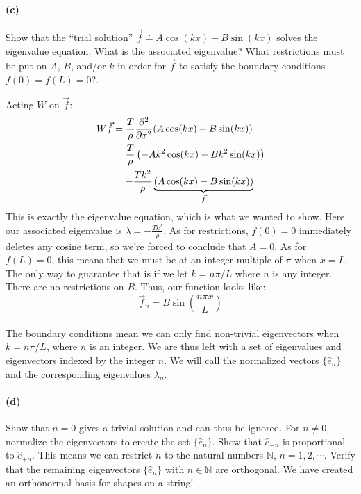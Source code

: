 \documentclass{article}
\begin{document}
\paragraph{(c)}
Show that the ``trial solution'' $\vec{f}\doteq A\cos(kx) + B \sin(kx)$ solves the eigenvalue equation.  What is the associated eigenvalue?
What restrictions must be put on $A$, $B$, and/or $k$ in order for $\vec{f}$ to satisfy the boundary conditions $f(0)=f(L)=0$?.

\begin{solution}
	Acting $W$ on $\vec f$:
	\begin{align*}
		W \vec f &= \frac{T}{\rho}\pdv[2]{x}(A \cos(kx) + B \sin (kx))\\
		&= \frac{T}{\rho}\left(-Ak^2 \cos(kx) - Bk^2\sin(kx)\right) \\
		&= -\frac{Tk^2}{\rho}\underbrace{(A \cos(kx) - B\sin(kx))}_{\vec f} 
	\end{align*}
	This is exactly the eigenvalue equation, which is what we wanted to show. Here, our associated eigenvalue is
	$\lambda = -\frac{Tk^2}{\rho}$. As for restrictions, $f(0) = 0$ immediately 
	deletes any cosine term, so we're forced to conclude that $A = 0$. As for $f(L) = 0$, this means that 
	we must be at an integer multiple of $\pi$ when $x = L$. The only way to guarantee that is if we let 
	$k = n\pi / L$ where $n$ is any integer. There are no restrictions on $B$. Thus, our function looks like:
	\[
	\vec f_n = B\sin(\frac{n \pi x}{L})
	\] 
\end{solution}
\phline
\paragraph{} 
The boundary conditions mean we can only find non-trivial eigenvectors when $k=n\pi/L$, where $n$ is an integer.  We are thus left with a set of eigenvalues and eigenvectors 
indexed by the integer $n$.  We will call the normalized vectors $\{\hat{e}_{n}\}$ and the corresponding eigenvalues $\lambda_{n}$.

\paragraph{(d)}
Show that $n=0$ gives a trivial solution and can thus be ignored.  For $n\neq 0$, normalize the eigenvectors to create the set $\{\hat{e}_{n}\}$.  Show that
$\hat{e}_{-n}$ is proportional to $\hat{e}_{+n}$.  This means we can restrict $n$ to the natural numbers $\mathbb{N}$, $n=1,2,\cdots$.
Verify that the remaining eigenvectors $\{\hat{e}_{n}\}$ with $n\in\mathbb{N}$ are orthogonal.
We have created an orthonormal basis for shapes on a string!
\end{document}
